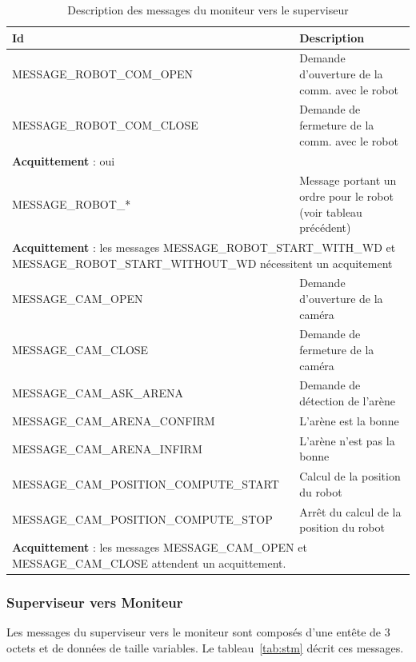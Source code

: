 \begin{appendices}
\begin{table}[htp]
\begin{center}
\begin{tabular}{|l|p{7cm}|}
\hline
{\bf Id} & {\bf Description} \\
\hline
MESSAGE\_ROBOT\_COM\_OPEN & Demande d'ouverture de la comm. avec le robot\\
MESSAGE\_ROBOT\_COM\_CLOSE  & Demande de fermeture de la comm. avec le robot \\
\hline
\multicolumn{2}{|l|}{{\bf Acquittement} : oui}\\
\hline
\hline
MESSAGE\_ROBOT\_* & Message portant un ordre pour le robot (voir tableau précédent)\\
\hline
\multicolumn{2}{|p{\textwidth}|}{{\bf Acquittement} : les messages MESSAGE\_ROBOT\_START\_WITH\_WD et MESSAGE\_ROBOT\_START\_WITHOUT\_WD nécessitent un acquitement}\\
\hline
\hline
MESSAGE\_CAM\_OPEN & Demande d'ouverture de la caméra\\
MESSAGE\_CAM\_CLOSE  & Demande de fermeture de la caméra\\
MESSAGE\_CAM\_ASK\_ARENA  & Demande de détection de l'arène \\
MESSAGE\_CAM\_ARENA\_CONFIRM  & L'arène est la bonne\\
MESSAGE\_CAM\_ARENA\_INFIRM  & L'arène n'est pas la bonne\\
MESSAGE\_CAM\_POSITION\_COMPUTE\_START  & Calcul de la position du robot\\
MESSAGE\_CAM\_POSITION\_COMPUTE\_STOP  & Arrêt du calcul de la position du robot\\
\hline
\multicolumn{2}{|p{\textwidth}|}{{\bf Acquittement} : les messages MESSAGE\_CAM\_OPEN et  MESSAGE\_CAM\_CLOSE attendent un acquittement.}\\
\hline
\end{tabular}
\end{center}
\caption{Description des messages du moniteur vers le superviseur}
\label{tab:mts}
\end{table}%

\newpage
\subsubsection{Superviseur vers Moniteur}
\label{sec:stm}

Les messages du superviseur vers le moniteur sont composés d'une entête de 3 octets et de données de taille variables. Le tableau~\ref{tab:stm} décrit ces messages.


\end{appendices}
